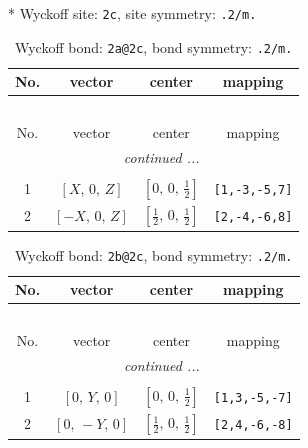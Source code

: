 \documentclass[fleqn,8pt]{jsarticle}
\begin{document}
* Wyckoff site: {\tt 2c}, site symmetry: {\tt .2/m.}
\renewcommand{\arraystretch}{1.2}
\begin{longtable}{cccc}
\caption{Wyckoff bond: {\tt 2a@2c}, bond symmetry: {\tt .2/m.}}
 \\
 \hline \hline
No. & vector & center & mapping \\ \hline \endfirsthead

\multicolumn{3}{l}{\tablename\ \thetable{}} \\
 \hline \hline
No. & vector & center & mapping \\ \hline \endhead

 \hline \hline
\multicolumn{3}{r}{\footnotesize\it continued ...} \\ \endfoot

 \hline \hline
\multicolumn{3}{r}{} \\ \endlastfoot

1 & $\left[ X,\, 0,\, Z \right]$ & $\left[ 0,\, 0,\, \frac{1}{2} \right]$ & {\tt [1,-3,-5,7]} \\ \hline
2 & $\left[ - X,\, 0,\, Z \right]$ & $\left[ \frac{1}{2},\, 0,\, \frac{1}{2} \right]$ & {\tt [2,-4,-6,8]} \\
\end{longtable}
\renewcommand{\arraystretch}{1.2}
\begin{longtable}{cccc}
\caption{Wyckoff bond: {\tt 2b@2c}, bond symmetry: {\tt .2/m.}}
 \\
 \hline \hline
No. & vector & center & mapping \\ \hline \endfirsthead

\multicolumn{3}{l}{\tablename\ \thetable{}} \\
 \hline \hline
No. & vector & center & mapping \\ \hline \endhead

 \hline \hline
\multicolumn{3}{r}{\footnotesize\it continued ...} \\ \endfoot

 \hline \hline
\multicolumn{3}{r}{} \\ \endlastfoot

1 & $\left[ 0,\, Y,\, 0 \right]$ & $\left[ 0,\, 0,\, \frac{1}{2} \right]$ & {\tt [1,3,-5,-7]} \\ \hline
2 & $\left[ 0,\, - Y,\, 0 \right]$ & $\left[ \frac{1}{2},\, 0,\, \frac{1}{2} \right]$ & {\tt [2,4,-6,-8]} \\
\end{longtable}
\renewcommand{\arraystretch}{1.2}
\end{document}
